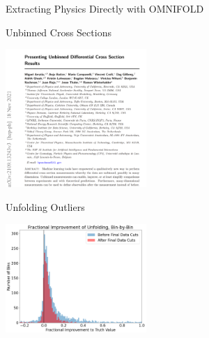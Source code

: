 \documentclass[aspectratio=169]{beamer}
\newcommand*{\myfont}{\fontfamily{lmtt}\selectfont}
\begin{document}
\begin{frame}{Extracting Physics Directly with OMNIFOLD}
                        {\myfont{\tiny    [ arxiv:1911.09107]   }}
                       

\end{frame}

\begin{frame}{Unbinned Cross Sections}

        \centering
        \includegraphics[width=0.4\textwidth]{lastminute/ubninned.png}              

\end{frame}

\begin{frame}{Unfolding Outliers}

        \centering
        \includegraphics[width=0.4\textwidth]{lastminute/binbybinimprovement.png}            

\end{frame}
\end{document}
